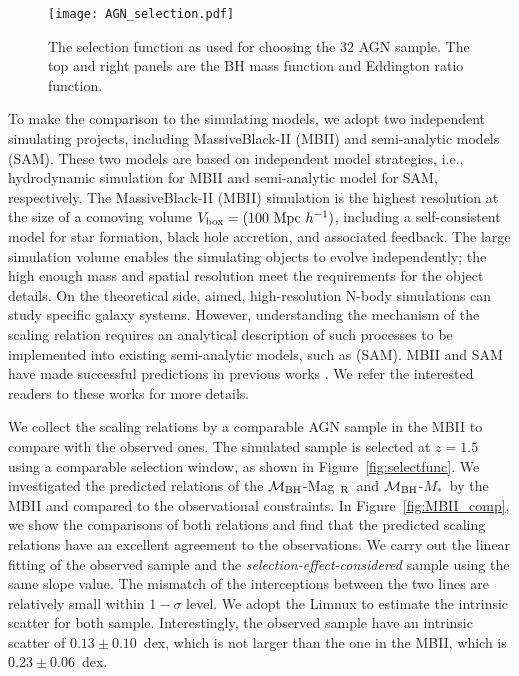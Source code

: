 \documentclass{natureprintstyle}
\newcommand{\mbh}{$\mathcal M_{\rm BH}$}
\newcommand{\mr}{Mag$_{\rm ~R}$}
\newcommand{\mstar}{{$M_*$}}
\begin{document}
\begin{figure}[t]
\texttt{[image: AGN\_selection.pdf]}
\caption{The selection function as used for choosing the 32 AGN sample. The top and right panels are the BH mass function and Eddington ratio function.
}
\label{fig:AGN_select}
\end{figure}

To make the comparison to the simulating models, we adopt two independent simulating projects, including MassiveBlack-II (MBII) and semi-analytic models (SAM). These two models are based on independent model strategies, i.e., hydrodynamic simulation for MBII and semi-analytic model for SAM, respectively. The MassiveBlack-II (MBII) simulation is the highest resolution at the size of a comoving volume $V_{\rm box} = (100~{\rm Mpc}~h^{-1})$, including a self-consistent model for star formation, black hole accretion, and associated feedback. The large simulation volume enables the simulating objects to evolve independently; the high enough mass and spatial resolution meet the requirements for the object details. On the theoretical side, aimed, high-resolution N-body simulations can study specific galaxy systems. However, understanding the mechanism of the scaling relation requires an analytical description of such processes to be implemented into existing semi-analytic models, such as (SAM). 
MBII and SAM have made successful predictions in previous works \cite{Menci2014, Menci2016, Khandai2015}. We refer the interested readers to these works for more details.


We collect the scaling relations by a comparable AGN sample in the MBII to compare with the observed ones. The simulated sample is selected at $z=1.5$ using a comparable selection window, as shown in Figure~\ref{fig:selectfunc}. We investigated the predicted relations of the \mbh-\mr\ and \mbh-\mstar\ by the MBII and compared to the observational constraints. In Figure~\ref{fig:MBII_comp}, we show the comparisons of both relations and find that the predicted scaling relations have an excellent agreement to the observations. We carry out the linear fitting of the observed sample and the {\it selection-effect-considered} sample using the same slope value. The mismatch of the interceptions between the two lines are relatively small within $1-\sigma$ level. We adopt the {\sc Limnux} to estimate the intrinsic scatter for both sample. Interestingly, the observed sample have an intrinsic scatter of $0.13\pm0.10$~dex, which is not larger than the one in the MBII, which is $0.23\pm0.06$~dex.
\end{document}
